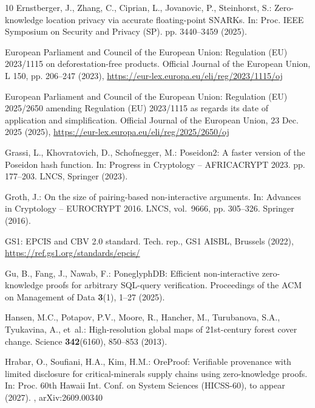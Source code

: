 \documentclass[runningheads]{llncs}
\begin{document}
\begin{thebibliography}{10}
Ernstberger, J., Zhang, C., Ciprian, L., Jovanovic, P., Steinhorst, S.:
  Zero-knowledge location privacy via accurate floating-point {SNARKs}. In:
  Proc. IEEE Symposium on Security and Privacy (SP). pp. 3440--3459 (2025).

{European Parliament and Council of the European Union}: Regulation ({EU})
  2023/1115 on deforestation-free products. Official Journal of the European
  Union, L 150, pp. 206--247 (2023),
  \url{https://eur-lex.europa.eu/eli/reg/2023/1115/oj}

{European Parliament and Council of the European Union}: Regulation ({EU})
  2025/2650 amending {Regulation (EU) 2023/1115} as regards its date of
  application and simplification. Official Journal of the European Union, 23
  Dec. 2025 (2025), \url{https://eur-lex.europa.eu/eli/reg/2025/2650/oj}

Grassi, L., Khovratovich, D., Schofnegger, M.: {Poseidon2}: A faster version of
  the {Poseidon} hash function. In: Progress in Cryptology -- AFRICACRYPT 2023.
  pp. 177--203. LNCS, Springer (2023). 

Groth, J.: On the size of pairing-based non-interactive arguments. In: Advances
  in Cryptology -- EUROCRYPT 2016. LNCS, vol.~9666, pp. 305--326. Springer
  (2016). 

{GS1}: {EPCIS} and {CBV} 2.0 standard. Tech. rep., GS1 AISBL, Brussels (2022),
  \url{https://ref.gs1.org/standards/epcis/}

Gu, B., Fang, J., Nawab, F.: {PoneglyphDB}: Efficient non-interactive
  zero-knowledge proofs for arbitrary {SQL}-query verification. Proceedings of
  the ACM on Management of Data  \textbf{3}(1),  1--27 (2025).

Hansen, M.C., Potapov, P.V., Moore, R., Hancher, M., Turubanova, S.A.,
  Tyukavina, A., et~al.: High-resolution global maps of 21st-century forest
  cover change. Science  \textbf{342}(6160),  850--853 (2013).

Hrabar, O., Soufiani, H.A., Kim, H.M.: {OreProof}: Verifiable provenance with
  limited disclosure for critical-minerals supply chains using zero-knowledge
  proofs. In: Proc. 60th Hawaii Int. Conf. on System Sciences (HICSS-60), to
  appear (2027). , arXiv:2609.00340


\end{thebibliography}
\end{document}

